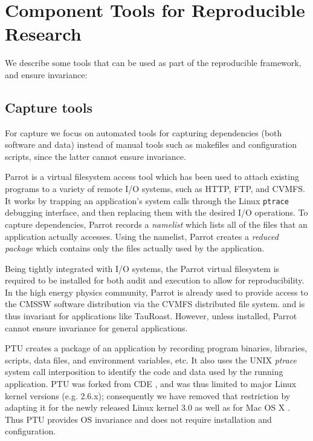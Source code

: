 \section{Component Tools for Reproducible Research}

We describe some tools that can be used as part of the reproducible framework, and ensure invariance:

\subsection{Capture tools} For capture we focus on automated tools for capturing dependencies (both software and data) instead of manual tools such as makefiles and configuration scripts, since the latter cannot ensure invariance. 

\vspace{5pt}
 Parrot is a virtual filesystem access tool which has been used to attach
existing programs to a variety of remote I/O systems, such as HTTP, FTP, and CVMFS.
It works by trapping an application's system calls through the Linux {\tt ptrace} debugging
interface, and then replacing them with the desired I/O operations. 
To capture dependencies, Parrot records a \emph{namelist} which lists all 
of the files that an application actually accesses. Using the namelist, Parrot creates a \emph{reduced package} which contains
only the files actually used by the application.

Being tightly integrated with I/O systems, the Parrot virtual filesystem is required to be installed for both audit and execution to allow for reproducibility.
In the high energy physics community, Parrot is already used to 
provide access to the CMSSW software distribution via the CVMFS distributed file system.
and is thus invariant for applications like TauRoast. However, unless installed, Parrot cannot ensure invariance for general applications. 

\vspace{5pt}
 PTU creates a package of an application by recording program binaries, libraries, scripts, data files, and environment variables, etc. It also uses the UNIX \emph{ptrace} system call interposition to identify the code and data used by the running application. PTU was forked from CDE \cite{}, and was thus limited to major Linux kernel versions (e.g. 2.6.x); consequently we have removed that restriction by adapting it for the newly released Linux kernel 3.0 as well as for Mac OS X \cite{}. Thus PTU provides OS invariance and does not require installation and configuration. 

